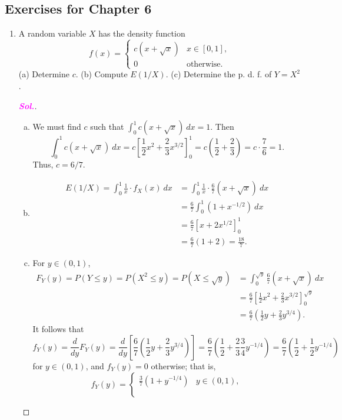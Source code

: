 \documentclass[12pt,a4paper]{article}
\theoremstyle{definition}
\theoremstyle{definition}
\theoremstyle{definition}
\theoremstyle{definition}
\theoremstyle{remark}
\theoremstyle{definition}
\newcommand{\dispsty}{\displaystyle}
\newcommand{\sol}{\textcolor{magenta}{\bf \textit{Sol.}}\quad}
\begin{document}
\subsection{Exercises for Chapter 6}
\begin{enumerate}[\bf 1.]
	\item A random variable $X$ has the density function \[
	f(x)=\begin{cases}
	c(x+\sqrt{x}) & x\in[0,1],\\
	0 &\text{otherwise}.
	\end{cases}
	\] (a) Determine $c$. (b) Compute $E(1/X)$. (c) Determine the p. d. f. of $Y=X^2$.\\ \begin{proof}[\sol]
		\begin{enumerate}[(a)]
			\item We must find $c$ such that $\int_0^1 c(x+\sqrt{x})\ dx=1$. Then \[
			\int_0^1c(x+\sqrt{x})\ dx=c\left[\frac{1}{2}x^2+\frac{2}{3}x^{3/2}\right]_0^1=c\left(\frac{1}{2}+\frac{2}{3}\right)=c\cdot\frac{7}{6}=1.
			\] Thus, $c=6/7$.
			\item \begin{align*}
			E(1/X)=\int_0^1\frac{1}{x}\cdot f_X(x)\ dx &= \int_0^1\frac{1}{x}\cdot \frac{6}{7}\left(x+\sqrt{x}\right)\ dx\\
			&=\frac{6}{7}\int_0^1(1+x^{-1/2})\ dx\\
			&=\frac{6}{7}\left[x+2x^{1/2}\right]_0^1\\
			&=\frac{6}{7}(1+2)=\frac{18}{7}.
			\end{align*}
			\item For $y\in(0,1)$, \begin{align*}
			F_Y(y)=P(Y\leq y)=P(X^2\leq y)=P(X\leq \sqrt{y})&=\int_{0}^{\sqrt{y}}\frac{6}{7}(x+\sqrt{x})\ dx\\
			&=\frac{6}{7}\left[\frac{1}{2}x^2+\frac{2}{3}x^{3/2}\right]_0^{\sqrt{y}}\\
			&=\frac{6}{7}\left(\frac{1}{2}y+\frac{2}{3}y^{3/4}\right).
			\end{align*} It follows that \[
			f_Y(y)=\frac{d}{dy}F_Y(y)=\frac{d}{dy}\left[\frac{6}{7}\left(\frac{1}{2}y+\frac{2}{3}y^{3/4}\right)\right]=\frac{6}{7}\left(\frac{1}{2}+\frac{2}{3}\frac{3}{4}y^{-1/4}\right)=\frac{6}{7}\left(\frac{1}{2}+\frac{1}{2}y^{-1/4}\right)
			\] for $y\in(0,1)$, and $f_Y(y)=0$ otherwise; that is, \[
			f_Y(y)=\begin{cases}
			\dispsty\frac{3}{7}\left(1+y^{-1/4}\right) & y\in(0,1),\\
			\\

\end{cases}\]
\end{enumerate}
\end{proof}
\end{enumerate}
\end{document}
